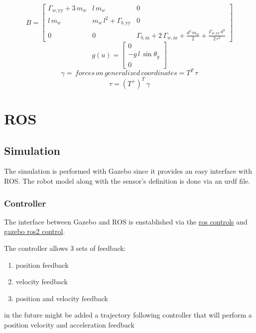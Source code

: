 \documentclass[a4paper, 7px]{article}
\begin{document}
$$B = 
\begin{bmatrix}
	\Gamma _{w,\mathrm{yy}}+3\,m_{w} & l\,m_{w} & 0\\
	l\,m_{w} & m_{w}\,l^2+\Gamma _{b,\mathrm{yy}} & 0\\
	0 & 0 & \Gamma _{b,\mathrm{zz}}+2\,\Gamma _{w,\mathrm{zz}}+\frac{d^2\,m_{w}}{2}+\frac{\Gamma _{w,\mathrm{yy}}\,d^2}{2\,r^2} \end{bmatrix}
$$
$$g(u) = 
\begin{bmatrix}
	0\\
	-g \, l \, \sin{\theta_y}\\
	0
\end{bmatrix}
$$
$$\gamma = \, forces \, on \, generalized \, coordinates = T^T \,  \tau$$
$$\tau = (T^+)^T \, \gamma$$


\section{ROS}

\subsection{Simulation}

The simulation is performed with Gazebo since it provides an easy interface with ROS.
The robot model along with the sensor's definition is done via an urdf file.

\subsubsection{Controller}
The interface between Gazebo and ROS is enstablished via the \href{https://github.com/ros-controls/ros2_control}{ros controls} 
and \href{https://github.com/ros-controls/gazebo_ros2_control}{gazebo ros2 control}.

The controller allows 3 sets of feedback:
\begin{enumerate}
	\item position feedback
	\item velocity feedback
	\item position and velocity feedback
\end{enumerate}

in the future might be added a trajectory following controller that will perform a position velocity and acceleration feedback
\end{document}
